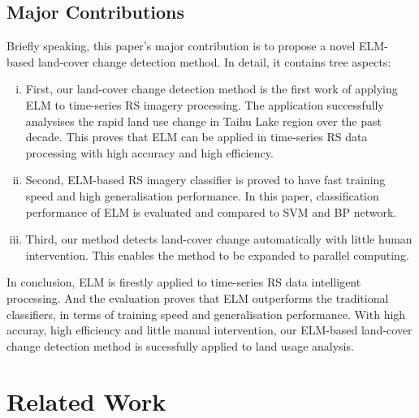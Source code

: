 \documentclass{elsart}
\begin{document}
\subsection{Major Contributions}
Briefly speaking, this paper's major contribution is to propose a novel ELM-based land-cover change detection method. 
In detail, it contains tree aspects:
\begin{enumerate}[(i)]
\item First, our land-cover change detection method is the first work of applying ELM to time-series RS imagery processing.
The application successfully analysises the rapid land use change in Taihu Lake region over the past decade.
This proves that ELM can be applied in time-series RS data processing with high accuracy and high efficiency. 
\item Second, ELM-based RS imagery classifier is proved to have fast training speed and high generalisation performance.
In this paper, classification performance of ELM is evaluated and compared to SVM and BP network.
\item Third, our method detects land-cover change automatically with little human intervention.
This enables the method to be expanded to parallel computing.
\end{enumerate}
\par
In conclusion, ELM is firestly applied to time-series RS data intelligent processing.
And the evaluation proves that ELM outperforms the traditional classifiers, in terms of training speed and generalisation performance.
With high accuray, high efficiency and little manual intervention, our ELM-based land-cover change detection method is sucessfully applied to land usage analysis.
\par


\section{Related Work}
\end{document}
